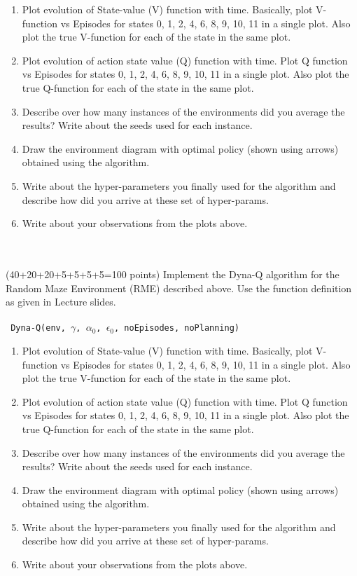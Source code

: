 \documentclass[a4 paper]{article}
\numberwithin{equation}{section}
\newcommand{\problem}[2]{~\\\fbox{\textbf{Problem #1}}\\(#2 points)\newline\newline}
\newcommand{\0}{\mathbf{0}}
\begin{document}
\begin{enumerate}[label=(\alph*)]
\item Plot evolution of State-value (V) function with time. Basically, plot V-function vs Episodes for states 0, 1, 2, 4, 6, 8,  9, 10, 11 in a single plot. Also plot the true V-function for each of the state in the same plot. 
\item Plot evolution of action state value (Q) function with time. Plot Q function vs Episodes for states 0, 1, 2, 4, 6, 8, 9, 10, 11 in a single plot. Also plot the true Q-function for each of the state in the same plot.  
\item Describe over how many instances of the environments did you average the results? Write about the seeds used for each instance. 
\item Draw the environment diagram with optimal policy (shown using arrows) obtained using the algorithm.  
\item Write about the hyper-parameters you finally used for the algorithm and describe how did you arrive at these set of hyper-params. 
\item Write about your observations from the plots above.
\end{enumerate}

\problem{10: Dyna-Q}{40+20+20+5+5+5+5=100}
Implement the Dyna-Q algorithm for the Random Maze Environment (RME) described above. Use the function definition as given in Lecture slides. \\
\\
\texttt{
Dyna-Q(env, $\gamma$, $\alpha_{0}$, $\epsilon_{0}$, noEpisodes, noPlanning)
}


\begin{enumerate}[label=(\alph*)]
\item Plot evolution of State-value (V) function with time. Basically, plot V-function vs Episodes for states 0, 1, 2, 4, 6, 8,  9, 10, 11 in a single plot. Also plot the true V-function for each of the state in the same plot. 
\item Plot evolution of action state value (Q) function with time. Plot Q function vs Episodes for states 0, 1, 2, 4, 6, 8, 9, 10, 11 in a single plot. Also plot the true Q-function for each of the state in the same plot.  
\item Describe over how many instances of the environments did you average the results? Write about the seeds used for each instance. 
\item Draw the environment diagram with optimal policy (shown using arrows) obtained using the algorithm.  
\item Write about the hyper-parameters you finally used for the algorithm and describe how did you arrive at these set of hyper-params. 
\item Write about your observations from the plots above.
\end{enumerate}
\end{document}

